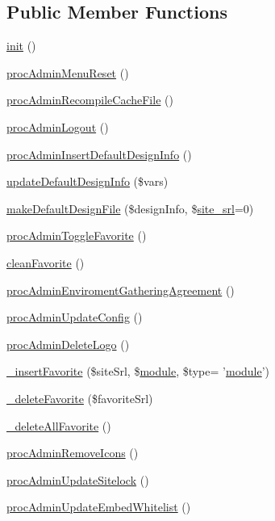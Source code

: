 \subsection*{Public Member Functions}
\begin{DoxyCompactItemize}
\item 
\hyperlink{classadminAdminController_abfceebf69c8870ad40dcb1714a6aae0e}{init} ()
\item 
\hyperlink{classadminAdminController_a0ba2a344a960ba3fa385f8450233cd32}{proc\-Admin\-Menu\-Reset} ()
\item 
\hyperlink{classadminAdminController_a15f6aab1393b491c9f754af46929fee7}{proc\-Admin\-Recompile\-Cache\-File} ()
\item 
\hyperlink{classadminAdminController_af49660a64f4b64c0b2f0801f4742abd1}{proc\-Admin\-Logout} ()
\item 
\hyperlink{classadminAdminController_ab0b62d09b5f73640ab9a7a7c5a58e579}{proc\-Admin\-Insert\-Default\-Design\-Info} ()
\item 
\hyperlink{classadminAdminController_ab0f984cd55d52455a818323404efb974}{update\-Default\-Design\-Info} (\$vars)
\item 
\hyperlink{classadminAdminController_a70c3ce620fc0791bb2acec0a9dedcc74}{make\-Default\-Design\-File} (\$design\-Info, \$\hyperlink{ko_8install_8php_a8b1406b4ad1048041558dce6bfe89004}{site\-\_\-srl}=0)
\item 
\hyperlink{classadminAdminController_ab7075e4e561ebf87b4d06418638d52ab}{proc\-Admin\-Toggle\-Favorite} ()
\item 
\hyperlink{classadminAdminController_a774b7d9260572f5d6391adc624e6b810}{clean\-Favorite} ()
\item 
\hyperlink{classadminAdminController_a8ef62179d5114d3d718846179d907bf0}{proc\-Admin\-Enviroment\-Gathering\-Agreement} ()
\item 
\hyperlink{classadminAdminController_a720735446257b930dce48d07c4ac9e4e}{proc\-Admin\-Update\-Config} ()
\item 
\hyperlink{classadminAdminController_a603a7e8aca1d391d61599b8db4ef2ccb}{proc\-Admin\-Delete\-Logo} ()
\item 
\hyperlink{classadminAdminController_a4d42a0954afb6d20d8f20617f8a5dac6}{\-\_\-insert\-Favorite} (\$site\-Srl, \$\hyperlink{classmodule}{module}, \$type= '\hyperlink{classmodule}{module}')
\item 
\hyperlink{classadminAdminController_aeaf185ff2307ca6fcccaf1589b25bc6f}{\-\_\-delete\-Favorite} (\$favorite\-Srl)
\item 
\hyperlink{classadminAdminController_af03754d231177ae0326f0cc262dd6dd7}{\-\_\-delete\-All\-Favorite} ()
\item 
\hyperlink{classadminAdminController_a9ddaddf87c06a8ef329ddc0d4305f5d1}{proc\-Admin\-Remove\-Icons} ()
\item 
\hyperlink{classadminAdminController_a4bbc5bf3f60f108c82b373b4b6fbf8a1}{proc\-Admin\-Update\-Sitelock} ()
\item 
\hyperlink{classadminAdminController_aff36b4021e19ccb44ab87043faf13b1a}{proc\-Admin\-Update\-Embed\-Whitelist} ()
\end{DoxyCompactItemize}
